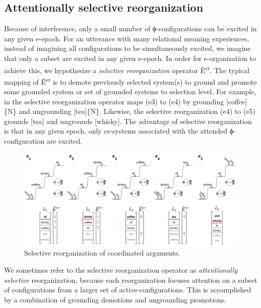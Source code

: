 \subsection{Attentionally selective reorganization}

Because of interference, only a small number of ϕ-configurations can be excited in any given e-epoch. For an utterance with many relational meaning experiences, instead of imagining all configurations to be simultaneously excited, we imagine that only a subset are excited in any given e-epoch. In order for e-organization to achieve this, we hypothesize a \textit{selective reorganization} operator Ê\textsuperscript{sr}. The typical mapping of  Ê\textsuperscript{sr} is to demote previously selected system(s) to ground and promote some grounded system or set of grounded systems to selection level. For example, in {} the selective reorganization operator maps (e3) to (e4) by grounding [coffee]\{N\} and ungrounding [tea]\{N\}. Likewise, the selective reorganization (e4) to (e5) grounds [tea] and ungrounds [whisky]. The advantage of selective reorganization is that in any given epoch, only cs-systems associated with the attended ϕ-configuration are excited.

  
\begin{figure}
\includegraphics[width=\textwidth]{figures/Tilsen-img99.png}
\caption{Selective reorganization of coordinated arguments.}
\label{fig:4:49}
\end{figure}
   

  We sometimes refer to the selective reorganization operator as \textit{attentionally selective} reorganization, because each reorganization focuses attention on a subset of configurations from a larger set of active-configurations. This is accomplished by a combination of grounding demotions and ungrounding promotions.

